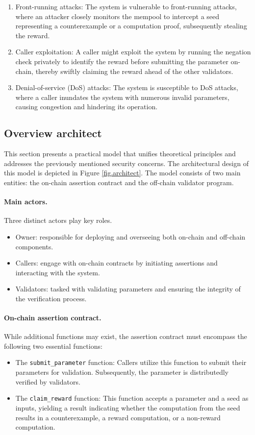 \documentclass[runningheads]{llncs}
\begin{document}
\begin{enumerate}
\item Front-running attacks: The system is vulnerable to front-running attacks, where an attacker closely monitors the mempool to intercept a seed representing a counterexample or a computation proof, subsequently stealing the reward.
\item Caller exploitation: A caller might exploit the system by running the negation check privately to identify the reward before submitting the parameter on-chain, thereby swiftly claiming the reward ahead of the other validators. 
\item Denial-of-service (DoS) attacks: The system is susceptible to DoS attacks, where a caller inundates the system with numerous invalid parameters, causing congestion and hindering its operation.
\end{enumerate}
\subsection{Overview architect}
This section presents a practical model that unifies theoretical principles and addresses the previously mentioned security concerns. The architectural design of this model is depicted in Figure \ref{fig.architect}. The model consists of two main entities: the on-chain assertion contract and the off-chain validator program. 
\paragraph{Main actors.} Three distinct actors play key roles.
\begin{itemize}
\item Owner: responsible for deploying and overseeing both on-chain and off-chain components.
\item Callers: engage with on-chain contracts by initiating assertions and interacting with the system.
\item Validators: tasked with validating parameters and ensuring the integrity of the verification process.
\end{itemize}
\paragraph{On-chain assertion contract.}
While additional functions may exist, the assertion contract must encompass the following two essential functions:
\begin{itemize}
\item The \lstinline|submit_parameter| function: Callers utilize this function to submit their parameters for validation. Subsequently, the parameter is distributedly verified by validators.
\item  The \lstinline|claim_reward| function: This function accepts a parameter and a seed as inputs, yielding a result indicating whether the computation from the seed results in a counterexample, a reward computation, or a non-reward computation.
\end{itemize}
\end{document}
